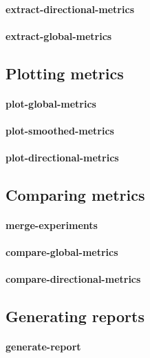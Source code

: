\paragraph{extract-directional-metrics}
\paragraph{extract-global-metrics}

\subsection{Plotting metrics}

\paragraph{plot-global-metrics}
\paragraph{plot-smoothed-metrics}
\paragraph{plot-directional-metrics}

\subsection{Comparing metrics}

\paragraph{merge-experiments}

\paragraph{compare-global-metrics}
\paragraph{compare-directional-metrics}

\subsection{Generating reports}

\paragraph{generate-report}

